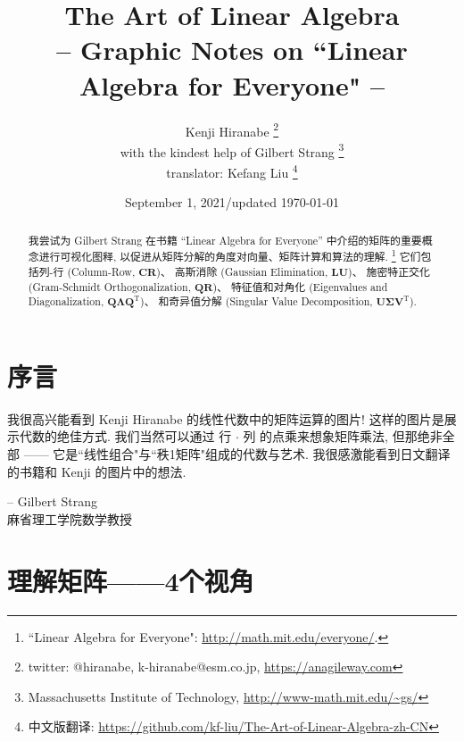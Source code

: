 \documentclass[letterpaper]{article}
\DeclareRobustCommand\transp{^{\mathrm{T}}}
\begin{document}
\title{The Art of Linear Algebra\\
\vspace{5pt}
\large{
-- Graphic Notes on ``Linear Algebra for Everyone" --
}
}

\author{Kenji Hiranabe
\thanks{twitter: @hiranabe, k-hiranabe@esm.co.jp, \url{https://anagileway.com}} \\
with the kindest help of Gilbert Strang
\thanks{Massachusetts Institute of Technology, \url{http://www-math.mit.edu/\~gs/}} \\
translator: Kefang Liu
\thanks{中文版翻译: \url{https://github.com/kf-liu/The-Art-of-Linear-Algebra-zh-CN}}
}

\date{September 1, 2021/updated \today}

\maketitle

\vspace{-5pt}
 
\begin{abstract}
我尝试为 Gilbert Strang 在书籍 “Linear Algebra for Everyone” 中介绍的矩阵的重要概念进行可视化图释, 
以促进从矩阵分解的角度对向量、矩阵计算和算法的理解.
\footnote{``Linear Algebra for Everyone": 
\url{http://math.mit.edu/everyone/}.}
它们包括列-行 (Column-Row, $\bm{CR}$)、
高斯消除 (Gaussian Elimination, $\bm{LU}$)、
施密特正交化 (Gram-Schmidt Orthogonalization, $\bm{QR}$)、
特征值和对角化 (Eigenvalues and Diagonalization, $\bm{Q \Lambda Q\transp}$)、
和奇异值分解 (Singular Value Decomposition, $\bm{U \Sigma V\transp}$).
\end{abstract}

\section*{序言}
我很高兴能看到 Kenji Hiranabe 的线性代数中的矩阵运算的图片! 
这样的图片是展示代数的绝佳方式. 我们当然可以通过 行 $\bm{\cdot}$ 列 的点乘来想象矩阵乘法, 
但那绝非全部 —— 它是``线性组合"与``秩1矩阵"组成的代数与艺术. 
我很感激能看到日文翻译的书籍和 Kenji 的图片中的想法. 
\begin{flushright}
-- Gilbert Strang \\ 麻省理工学院数学教授
\end{flushright}

\tableofcontents

\section{理解矩阵——4个视角}
\end{document}
